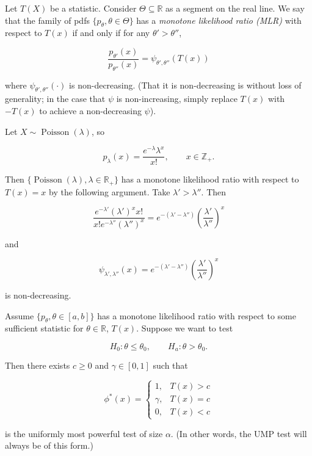 \begin{definition}

Let \(T(X)\) be a statistic. Consider \(\Theta \subseteq \mathbb{R}\) as a segment on the real line. We say that the family of pdfs \(\{p_\theta, \theta \in \Theta\}\) has a \textit{monotone likelihood ratio (MLR)} with respect to \(T(x)\) if and only if for any \(\theta' > \theta''\), 

\[
\frac{p_{\theta'}(x)}{p_{\theta''}(x)} = \psi_{\theta', \theta''}(T(x))
\]

where \(\psi_{\theta', \theta''}(\cdot)\) is non-decreasing. (That it is non-decreasing is without loss of generality; in the case that \(\psi\) is non-increasing, simply replace \(T(x)\) with \(-T(x)\) to achieve a non-decreasing \(\psi\)).

\end{definition}

\begin{example}

Let \(X \sim \operatorname{Poisson}(\lambda)\), so 

\[
p_\lambda(x) =  \frac{e^{-\lambda} \lambda^x}{x!}, \qquad x \in \mathbb{Z}_+.
\]

Then  \(\{ \operatorname{Poisson}(\lambda), \lambda \in \mathbb{R}_+\}\) has a monotone likelihood ratio with respect to \(T(x) =x\) by the following argument. Take \(\lambda' > \lambda ''\). Then 

\[
\frac{e^{- \lambda '} (\lambda')^x x! }{x! e^{-\lambda ''} (\lambda'')^x }=  e^{-(\lambda' - \lambda'')} \left( \frac{ \lambda'}{\lambda ''} \right)^x
\]

and

\[
\psi_{\lambda', \lambda''}(x) = e^{-(\lambda' - \lambda'')} \left( \frac{ \lambda'}{\lambda ''} \right)^x
\]

is non-decreasing. 

\end{example}

\begin{theorem}\label{mathstasts.thm.karlin.rubin}

Assume \(\{p_\theta, \theta \in[a,b]\}\) has a monotone likelihood ratio with respect to some sufficient statistic for \(\theta \in \mathbb{R}\), \(T(x)\). Suppose we want to test

\[
H_0: \theta \leq \theta_0, \qquad H_a: \theta > \theta_0.
\]

Then there exists \(c \geq 0\) and \(\gamma \in [0,1]\) such that 

\[
\phi^*(x) = \begin{cases}
1, &  T(x) >c \\
\gamma, & T(x) = c \\
0, & T(x) < c
\end{cases}
\]

is the uniformly most powerful test of size \(\alpha\). (In other words, the UMP test will always be of this form.)

\end{theorem}


